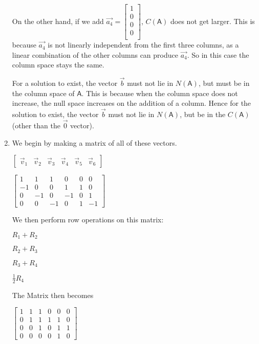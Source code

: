 \documentclass[a4paper, 11pt]{article}
\newcommand{\mat}[1]{\boldsymbol { \mathsf{#1}} }
\begin{document}
\begin{enumerate}
On the other hand, if we add $\vec{a_4} = \begin{bmatrix}
1 \\
0 \\
0 \\
0 \\
\end{bmatrix}$, $C(\mat{A})$ does not get larger. This is because $\vec{a_4}$ is not linearly independent from the first three columns, as a linear combination of the other columns can produce $\vec{a_4}$. So in this case the column space stays the same.

For a solution to exist, the vector $\vec b$ must not lie in $N(\mat{A})$, but must be in the column space of $\mat{A}$. This is because when the column space does not increase, the null space increases on the addition of a column. Hence for the solution to exist, the vector $\vec{b}$ must not lie in $N(\mat{A})$, but be in the $C(\mat{A})$ (other than the $\vec{0}$ vector).

\item We begin by making a matrix of all of these vectors. 

\begin{center}

$
\begin{bmatrix}
\vec v_1 & \vec v_2 & \vec v_3 & \vec v_4 & \vec v_5 & \vec v_6  
\end{bmatrix}
$

$
\begin{bmatrix}
1 & 1 & 1 & 0 & 0 & 0 \\
-1 & 0 & 0 & 1 & 1 & 0\\
0 & -1 & 0 & -1 & 0 & 1\\ 
0 & 0 & -1 & 0 & 1 & -1 
\end{bmatrix}
$

\end{center}

We then perform row operations on this matrix:
\begin{center}
$R_1 + R_2$

$R_2 + R_3$

$R_3 + R_4$

$\frac{1}{2} R_4$
\end{center}

The Matrix then becomes 

\begin{center}
$
\begin{bmatrix}
1 & 1 & 1 & 0 & 0 & 0 \\
0 & 1 & 1 & 1 & 1 & 0\\
0 & 0 & 1 & 0 & 1 & 1\\ 
0 & 0 & 0 & 0 & 1 & 0 
\end{bmatrix}
$
\end{center}


\end{enumerate}
\end{document}
